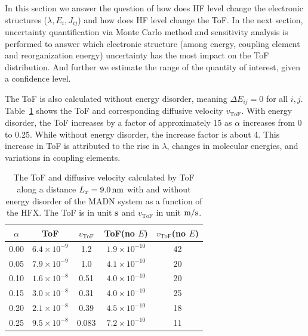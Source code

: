 \documentclass[%
 reprint,
superscriptaddress,
 amsmath,amssymb,
 aps,
prb,
floatfix
]{revtex4-2}
\begin{document}
In this section we answer the question of how does HF level change the electronic structures ($\lambda, E_i, J_{ij}$) and 
how does HF level change the ToF. 
In the next section, uncertainty quantification via Monte Carlo method and sensitivity analysis is performed to answer which electronic structure (among energy, coupling element and reorganization energy) uncertainty has the most impact on the ToF distribution. 
And further we estimate the range of the quantity of interest, given a confidence level.


The ToF is also calculated without energy disorder, meaning $\Delta E_{ij}=0$ for all $i,j$.
Table~\ref{tab:ToF_MADN_HFX} shows the ToF and corresponding diffusive velocity $v_\text{ToF}$.
With energy disorder, the ToF increases by a factor of approximately 15 as $\alpha$ increases from 0 to 0.25.  
While without energy disorder, the increase factor is about 4. This increase in ToF is attributed to the rise in $\lambda$, changes in molecular energies, and variations in coupling elements.

\begin{table}[tbp]
\caption{The ToF and diffusive velocity calculated by ToF along a distance $L_x = \unit[9.0]{nm}$ with and without energy disorder of the MADN system as a function of the HFX. The ToF is in unit $\unit[]{s}$ and $v_\text{ToF}$ in unit $\unit[]{m/s}$.}
\begin{ruledtabular}
  \begin{tabular}{c c c c c}
        $\alpha$ & ToF& $v_\text{ToF}$ & ToF(no $E$)& $v_\text{ToF}$(no $E$) \\
    \hline
        0.00 &  $6.4 \times 10^{-9}$ & 1.2 & $1.9 \times 10^{-10}$ & 42 \\
        0.05 & $ 7.9 \times 10^{-9}$ & 1.0 & $4.1 \times 10^{-10}$ & 20 \\
        0.10 & $ 1.6 \times 10^{-8}$ & 0.51 & $4.0 \times 10^{-10} $ & 20 \\
        0.15 & $ 3.0 \times 10^{-8}$ & 0.31 & $4.0 \times 10^{-10} $ & 25 \\
        0.20 & $ 2.1 \times 10^{-8}$ & 0.39 & $4.5 \times 10^{-10}$ & 18 \\
        0.25 & $ 9.5 \times 10^{-8}$ & 0.083 & $7.2 \times 10^{-10}$ & 11 \\
    \end{tabular}
\end{ruledtabular}
\label{tab:ToF_MADN_HFX}
\end{table}


\end{document}

